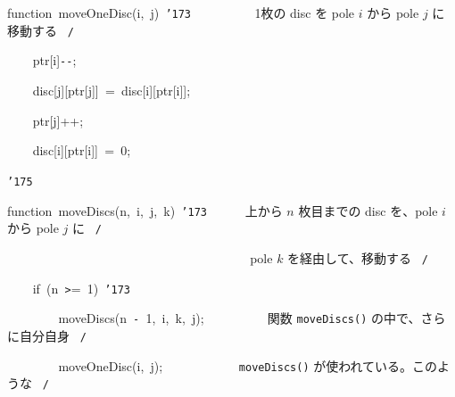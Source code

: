 \documentclass[a4paper,10pt]{article}
\def\mc{\relax}
\begin{document}
\noindent
\mbox{}\hfill

\noindent
\mbox{}function{\tt\mc \ }moveOneDisc(i,{\tt\mc \ }j){\tt\mc \ }{\tt\char'173}{\tt\mc \ }{\tt\mc \ }{\tt\mc \ }{\tt\mc \ }{\tt\mc \ }{\tt\mc \ }{\tt\mc \ }{\tt\mc \ }\rm\mc {\tt /}{\tt *}\  \ 1枚の disc を pole $i$ から
                                    pole $j$ に移動する \hfill \rm\mc \ {\tt *}{\tt /}
\tt\mc 

\noindent
\mbox{}{\tt\mc \ }{\tt\mc \ }{\tt\mc \ }{\tt\mc \ }ptr[i]{\tt -}{\tt -};

\noindent
\mbox{}{\tt\mc \ }{\tt\mc \ }{\tt\mc \ }{\tt\mc \ }disc[j][ptr[j]]{\tt\mc \ }={\tt\mc \ }disc[i][ptr[i]];

\noindent
\mbox{}{\tt\mc \ }{\tt\mc \ }{\tt\mc \ }{\tt\mc \ }ptr[j]++;

\noindent
\mbox{}{\tt\mc \ }{\tt\mc \ }{\tt\mc \ }{\tt\mc \ }disc[i][ptr[i]]{\tt\mc \ }={\tt\mc \ }0;

\noindent
\mbox{}{\tt\char'175}

\noindent
\mbox{}\hfill

\noindent
\mbox{}function{\tt\mc \ }moveDiscs(n,{\tt\mc \ }i,{\tt\mc \ }j,{\tt\mc \ }k){\tt\mc \ }{\tt\char'173}{\tt\mc \ }{\tt\mc \ }{\tt\mc \ }{\tt\mc \ }\rm\mc {\tt /}{\tt *}\  \ 上から $n$ 枚目までの disc を、pole $i$ から pole $j$ に \hfill \rm\mc \ {\tt *}{\tt /}
\tt\mc 

\noindent
\mbox{}{\tt\mc \ }{\tt\mc \ }{\tt\mc \ }{\tt\mc \ }{\tt\mc \ }{\tt\mc \ }{\tt\mc \ }{\tt\mc \ }{\tt\mc \ }{\tt\mc \ }{\tt\mc \ }{\tt\mc \ }{\tt\mc \ }{\tt\mc \ }{\tt\mc \ }{\tt\mc \ }{\tt\mc \ }{\tt\mc \ }{\tt\mc \ }{\tt\mc \ }{\tt\mc \ }{\tt\mc \ }{\tt\mc \ }{\tt\mc \ }{\tt\mc \ }{\tt\mc \ }{\tt\mc \ }{\tt\mc \ }{\tt\mc \ }{\tt\mc \ }{\tt\mc \ }{\tt\mc \ }{\tt\mc \ }{\tt\mc \ }{\tt\mc \ }{\tt\mc \ }\rm\mc {\tt /}{\tt *}\  \ pole $k$ を経由して、移動する \hfill \rm\mc \ {\tt *}{\tt /}
\tt\mc 

\noindent
\mbox{}{\tt\mc \ }{\tt\mc \ }{\tt\mc \ }{\tt\mc \ }if{\tt\mc \ }(n{\tt\mc \ }{\tt >}={\tt\mc \ }1){\tt\mc \ }{\tt\char'173}

\noindent
\mbox{}{\tt\mc \ }{\tt\mc \ }{\tt\mc \ }{\tt\mc \ }{\tt\mc \ }{\tt\mc \ }{\tt\mc \ }{\tt\mc \ }moveDiscs(n{\tt\mc \ }{\tt -}{\tt\mc \ }1,{\tt\mc \ }i,{\tt\mc \ }k,{\tt\mc \ }j);{\tt\mc \ \ \ \ \ \ \ \ }\rm\mc {\tt /}{\tt *}\  \ 関数 {\tt moveDiscs()} の中で、さらに自分自身 \hfill \rm\mc \ {\tt *}{\tt /}
\tt\mc 

\noindent
\mbox{}{\tt\mc \ }{\tt\mc \ }{\tt\mc \ }{\tt\mc \ }{\tt\mc \ }{\tt\mc \ }{\tt\mc \ }{\tt\mc \ }moveOneDisc(i,{\tt\mc \ }j);{\tt\mc \ }{\tt\mc \ }{\tt\mc \ }{\tt\mc \ }{\tt\mc \ }{\tt\mc \ }{\tt\mc \ }{\tt\mc \ }{\tt\mc \ }{\tt\mc \ }\rm\mc {\tt /}{\tt *}\  \ {\tt moveDiscs()} が使われている。このような \hfill \rm\mc \ {\tt *}{\tt /}
\tt\mc 
\end{document}
